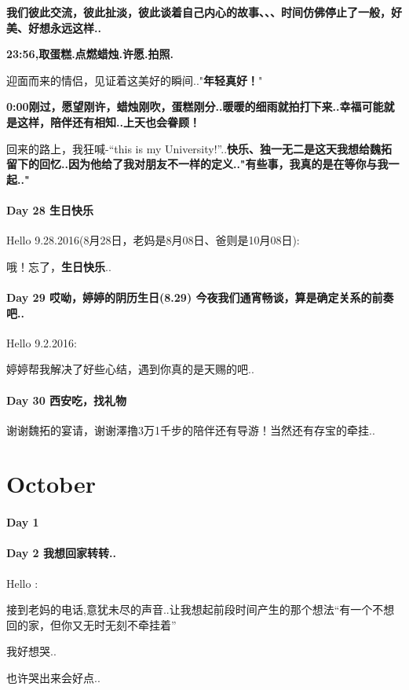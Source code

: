 \documentclass[UTF8,a4paper,8pt]{ctexbook}
\begin{document}
	 	 \textbf{我们彼此交流，彼此扯淡，彼此谈着自己内心的故事、、、时间仿佛停止了一般，好美、好想永远这样..}
	 	 
	 	 \textbf{23:56,取蛋糕.点燃蜡烛.许愿.拍照.}
	 	 
	 	 迎面而来的情侣，见证着这美好的瞬间.."\textbf{年轻真好！}"
	 	 
	 	 \textbf{0:00刚过，愿望刚许，蜡烛刚吹，蛋糕刚分..暖暖的细雨就拍打下来..幸福可能就是这样，陪伴还有相知..上天也会眷顾！}
	 	 
	 	 回来的路上，我狂喊-“this is my University!”..\textbf{快乐、独一无二是这天我想给魏拓留下的回忆..因为他给了我对朋友不一样的定义.."有些事，我真的是在等你与我一起.."}
 	 \paragraph{Day 28   生日快乐   \quad     }
	 	 Hello 9.28.2016(8月28日，老妈是8月08日、爸则是10月08日):
	 	 
	 	 哦！忘了，\textbf{生日快乐}..
 	 \paragraph{Day 29   哎呦，婷婷的阴历生日(8.29)   \quad  今夜我们通宵畅谈，算是确定关系的前奏吧..   }
	 	 Hello 9.2.2016:
	 	 
		 婷婷帮我解决了好些心结，遇到你真的是天赐的吧..   
 	 \paragraph{Day 30   西安吃，找礼物   \quad     }
	 	 谢谢魏拓的宴请，谢谢澤撸3万1千步的陪伴还有导游！当然还有存宝的牵挂..
 \section*{October}
 	 \paragraph{Day 1       \quad     }
 	 \paragraph{Day 2   我想回家转转..    \quad   }
	 	 Hello :
	 	 
	 	 接到老妈的电话,意犹未尽的声音..让我想起前段时间产生的那个想法“有一个不想回的家，但你又无时无刻不牵挂着”
	 	 
	 	 我好想哭..
	 	 
	 	 也许哭出来会好点..
	 	 
\end{document}

